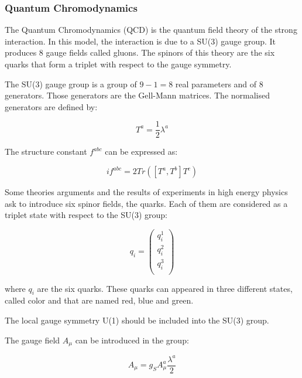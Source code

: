     \subsubsection{Quantum Chromodynamics}
    
    The Quantum Chromodynamics (QCD) is the quantum field theory of the strong interaction.
    In this model, the interaction is due to a SU(3) gauge group. 
    It produces 8 gauge fields called gluons.
    The spinors of this theory are the six quarks that form a triplet with respect to the gauge symmetry.

    The SU(3) gauge group is a group of $9 - 1 = 8$ real parameters and of 8 generators. 
    Those generators are the Gell-Mann matrices. 
    The normalised generators are defined by: 
    
    \begin{equation}
        T^a = \frac{1}{2}\lambda^a
    \end{equation}

    The structure constant $f^{abc}$ can be expressed as:

    \begin{equation}
        if^{abc} = 2 Tr([T^a,T^b]T^c)
    \end{equation}
     
    Some theories arguments and the results of experiments in high energy physics ask to introduce six spinor fields, the quarks.
    Each of them are considered as a triplet state with respect to the SU(3) group:

    \begin{equation}
      q_i = 
        \begin{pmatrix}
          q_i^1 \\
          q_i^2 \\
          q_i^3 \\
        \end{pmatrix}
     \end{equation}
    
    where $q_i$ are the six quarks.
    These quarks can appeared in three different states, called color and that are named red, blue and green.

    The local gauge symmetry U(1) should be included into the SU(3) group.
    
    The gauge field $A_{\mu}$ can be introduced in the group:
    
    \begin{equation}
      A_{\mu} = g_S A^a_{\mu}\frac{\lambda^a}{2}
    \end{equation}
     
